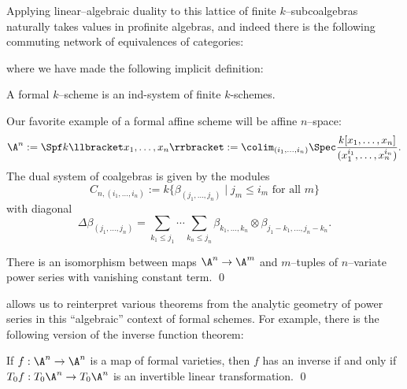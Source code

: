 Applying linear--algebraic duality to this lattice of finite $k$--subcoalgebras naturally takes values in profinite algebras, and indeed there is the following commuting network of equivalences of categories:
\begin{center}
\end{center}
where we have made the following implicit definition:
\begin{definition}
A formal $k$--scheme is an ind-system of finite $k$-schemes.
\end{definition}

\begin{example}\label{AffineSpaceFormulas}
Our favorite example of a formal affine scheme will be affine $n$--space: \[\A^n := \Spf k\llbracket x_1, \ldots, x_n \rrbracket := \colim_{(i_1, \ldots, i_n)} \Spec \frac{k[x_1, \ldots, x_n]}{(x_1^{i_1}, \ldots, x_n^{i_n})}.\]  The dual system of coalgebras is given by the modules \[C_{n, (i_1, \ldots, i_n)} := k\{\beta_{(j_1, \ldots, j_n)} \mid \text{$j_m \le i_m$ for all $m$}\}\] with diagonal \[\Delta \beta_{(j_1, \ldots, j_n)} = \sum_{k_1 \le j_1} \cdots \sum_{k_n \le j_n} \beta_{k_1, \ldots, k_n} \otimes \beta_{j_1 - k_1, \ldots, j_n - k_n}.\]
\end{example}

\begin{lemma}\label{EARLYMapsOfAffineSpaces}
There is an isomorphism between maps $\A^n \to \A^m$ and $m$--tuples of $n$--variate power series with vanishing constant term. \qed
\end{lemma}

 allows us to reinterpret various theorems from the analytic geometry of power series in this ``algebraic'' context of formal schemes.  For example, there is the following version of the inverse function theorem:

\begin{lemma}\label{InverseFunctionTheorem}
If $f: \A^n \to \A^n$ is a map of formal varieties, then $f$ has an inverse if and only if $T_0 f: T_0 \A^n \to T_0 \A^n$ is an invertible linear transformation. \qed
\end{lemma}

